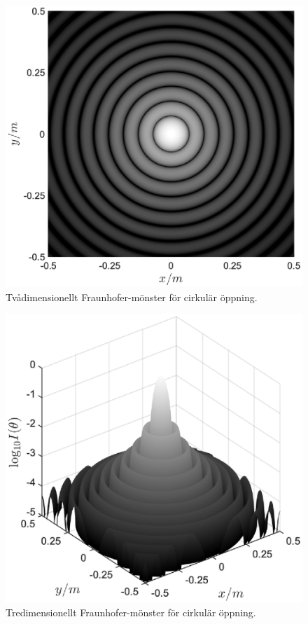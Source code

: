 \begin{figure}[H]
    \centering
    \captionsetup{justification=centering,margin=2cm}
    \includegraphics[scale=0.65]{Resources/Graphics/fig5_3.eps}
    \caption{Tvådimensionellt Fraunhofer-mönster för cirkulär öppning.}
    \label{fig:5_3}
\end{figure}

\begin{figure}[H]
    \centering
    \captionsetup{justification=centering,margin=2cm}
    \includegraphics[scale=0.65]{Resources/Graphics/fig5_4.eps}
    \caption{Tredimensionellt Fraunhofer-mönster för cirkulär öppning.}
    \label{fig:5_4}
\end{figure}

